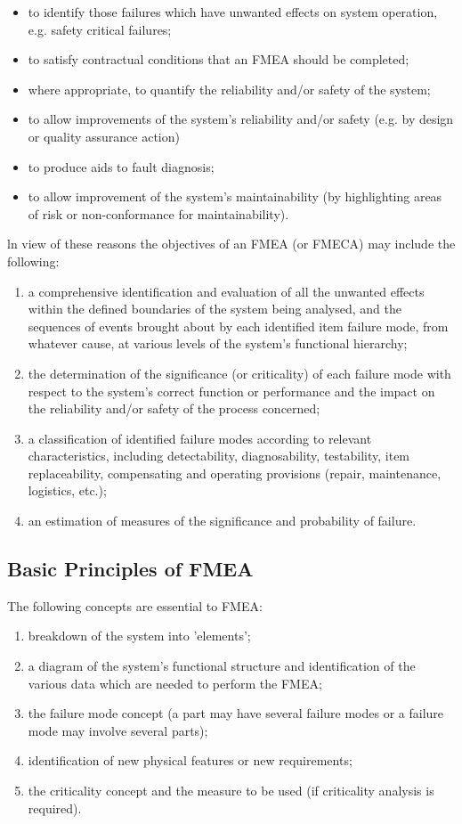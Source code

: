 \documentclass[./dissertation.tex]{subfiles}
\begin{document}
\begin{itemize}
    \item to identify those failures which have unwanted effects on system operation, e.g. safety critical failures;
    \item to satisfy contractual conditions that an FMEA should be completed;
    \item where appropriate, to quantify the reliability and/or safety of the system;
    \item to allow improvements of the system's reliability and/or safety (e.g. by design or quality assurance action)
    \item to produce aids to fault diagnosis;
    \item to allow improvement of the system's maintainability (by highlighting areas of risk or non-conformance for maintainability).
\end{itemize}

ln view of these reasons the objectives of an FMEA (or FMECA) may include the following: 

\begin{enumerate}
    \item a comprehensive identification and evaluation of all the unwanted effects within the defined boundaries of the system being analysed, and the sequences of events brought about by each identified item failure mode, from whatever cause, at various levels of the system's functional hierarchy;
    \item the determination of the significance (or criticality) of each failure mode with respect to the system's correct function or performance and the impact on the reliability and/or safety of the process concerned;
    \item a classification of identified failure modes according to relevant characteristics, including detectability, diagnosability, testability, item replaceability, compensating and operating provisions (repair, maintenance, logistics, etc.);
    \item an estimation of measures of the significance and probability of failure.
\end{enumerate}


\subsection{Basic Principles of FMEA}
The following concepts are essential to FMEA:

\begin{enumerate}
    \item breakdown of the system into 'elements';
    \item a diagram of the system's functional structure and identification of the various data which are needed to perform the FMEA;
    \item the failure mode concept (a part may have several failure modes or a failure mode may involve several parts);
    \item identification of new physical features or new requirements;
    \item the criticality concept and the measure to be used (if criticality analysis is required).
\end{enumerate}
\end{document}
